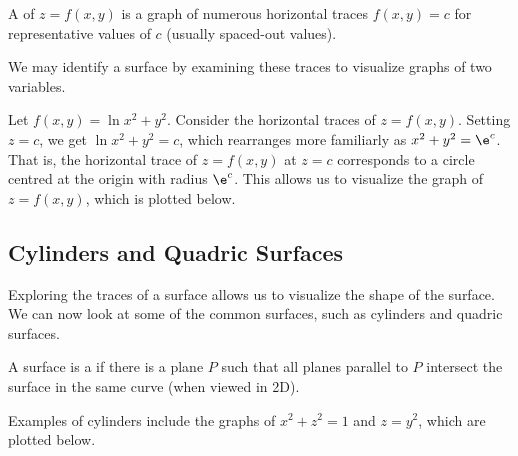 \begin{definition}
    A  of $z = f(x, y)$ is a graph of numerous horizontal traces $f(x, y) = c$ for representative values of $c$ (usually spaced-out values).
\end{definition}

We may identify a surface by examining these traces to visualize graphs of two variables.

\begin{example}[Graph of $z = f(x, y)$]
    Let $f(x, y) = \ln{x^2 + y^2}$. Consider the horizontal traces of $z = f(x, y)$. Setting $z = c$, we get $\ln{x^2 + y^2} = c$, which rearranges more familiarly as $x^2 + y^2 = \e^c$. That is, the horizontal trace of $z = f(x, y)$ at $z = c$ corresponds to a circle centred at the origin with radius $\e^c$. This allows us to visualize the graph of $z = f(x, y)$, which is plotted below.

    \begin{figure}[H]
        \centering
        \caption{}
    \end{figure}
\end{example}

\subsection{Cylinders and Quadric Surfaces}

Exploring the traces of a surface allows us to visualize the shape of the surface. We can now look at some of the common surfaces, such as cylinders and quadric surfaces.

\begin{definition}
    A surface is a  if there is a plane $P$ such that all planes parallel to $P$ intersect the surface in the same curve (when viewed in 2D).
\end{definition}

Examples of cylinders include the graphs of $x^2 + z^2 = 1$ and $z = y^2$, which are plotted below.

